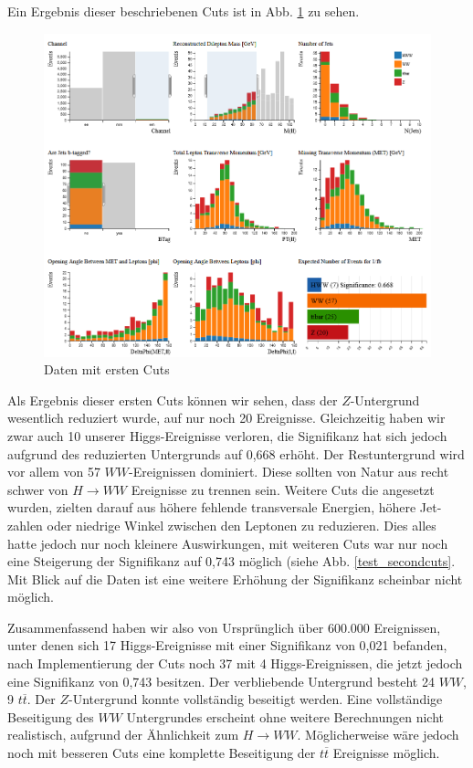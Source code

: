 Ein Ergebnis dieser beschriebenen Cuts ist in Abb. \ref{test_firstcuts} zu sehen.

\begin{figure}[h]
\includegraphics[width=\linewidth]{../Pictures/Auswertung/test_firstcuts.png}
\caption{Daten mit ersten Cuts \cite{opendata}}
\label{test_firstcuts}
\end{figure}

Als Ergebnis dieser ersten Cuts können wir sehen, dass der $Z$-Untergrund wesentlich reduziert wurde, auf nur noch 20 Ereignisse.
Gleichzeitig haben wir zwar auch 10 unserer Higgs-Ereignisse verloren, die Signifikanz hat sich jedoch aufgrund des reduzierten Untergrunds auf 0,668 erhöht.
Der Restuntergrund wird vor allem von 57 $WW$-Ereignissen dominiert.
Diese sollten von Natur aus recht schwer von $H \rightarrow WW$ Ereignisse zu trennen sein.
Weitere Cuts die angesetzt wurden, zielten darauf aus höhere fehlende transversale Energien, höhere Jet-zahlen oder niedrige Winkel zwischen den Leptonen zu reduzieren.
Dies alles hatte jedoch nur noch kleinere Auswirkungen, mit weiteren Cuts war nur noch eine Steigerung der Signifikanz auf 0,743 möglich (siehe Abb. \ref{test_secondcuts}.
Mit Blick auf die Daten ist eine weitere Erhöhung der Signifikanz scheinbar nicht möglich.

Zusammenfassend haben wir also von Ursprünglich über 600.000 Ereignissen, unter denen sich 17 Higgs-Ereignisse mit einer Signifikanz von 0,021 befanden, nach Implementierung der Cuts noch 37 mit 4 Higgs-Ereignissen, die jetzt jedoch eine Signifikanz von 0,743 besitzen.
Der verbliebende Untergrund besteht 24 $WW$, 9 $t\overline{t}$.
Der $Z$-Untergrund konnte vollständig beseitigt werden.
Eine vollständige Beseitigung des $WW$ Untergrundes erscheint ohne weitere Berechnungen nicht realistisch, aufgrund der Ähnlichkeit zum $H \rightarrow WW$.
Möglicherweise wäre jedoch noch mit besseren Cuts eine komplette Beseitigung der $t\overline{t}$ Ereignisse möglich.

